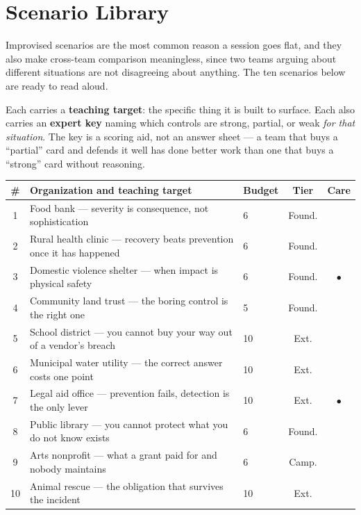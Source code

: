 %
%

\section{Scenario Library}
\label{app:scenarios}

Improvised scenarios are the most common reason a session goes flat, and
they also make cross-team comparison meaningless, since two teams arguing
about different situations are not disagreeing about anything. The ten
scenarios below are ready to read aloud.

Each carries a \textbf{teaching target}: the specific thing it is built to
surface. Each also carries an \textbf{expert key} naming which controls are
strong, partial, or weak \emph{for that situation}. The key is a scoring aid,
not an answer sheet --- a team that buys a ``partial'' card and defends it well
has done better work than one that buys a ``strong'' card without reasoning.

\begin{center}
\small
\begin{tabularx}{\textwidth}{@{}c X l c c@{}}
\toprule
\textbf{\#} & \textbf{Organization and teaching target} & \textbf{Budget} & \textbf{Tier} & \textbf{Care} \\
\midrule
1  & Food bank --- severity is consequence, not sophistication & 6 & Found. & \\
2  & Rural health clinic --- recovery beats prevention once it has happened & 6 & Found. & \\
3  & Domestic violence shelter --- when impact is physical safety & 6 & Found. & $\bullet$ \\
4  & Community land trust --- the boring control is the right one & 5 & Found. & \\
5  & School district --- you cannot buy your way out of a vendor's breach & 10 & Ext. & \\
6  & Municipal water utility --- the correct answer costs one point & 10 & Ext. & \\
7  & Legal aid office --- prevention fails, detection is the only lever & 10 & Ext. & $\bullet$ \\
8  & Public library --- you cannot protect what you do not know exists & 6 & Found. & \\
9  & Arts nonprofit --- what a grant paid for and nobody maintains & 6 & Camp. & \\
10 & Animal rescue --- the obligation that survives the incident & 10 & Ext. & \\
\bottomrule
\end{tabularx}
\end{center}

